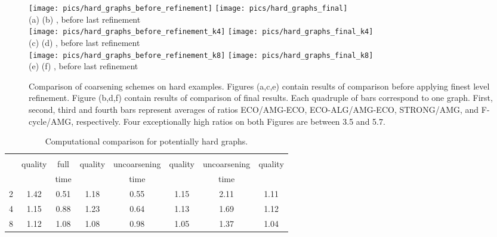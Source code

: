 \documentclass{llncs}
\begin{document}
\begin{figure}
\texttt{[image: pics/hard\_graphs\_before\_refinement]}  \hspace{-1cm}
\texttt{[image: pics/hard\_graphs\_final]}\\
 \hspace{4cm} (a)  \hspace{4cm} (b) , before last refinement \\
\texttt{[image: pics/hard\_graphs\_before\_refinement\_k4]}  \hspace{-1cm}
\texttt{[image: pics/hard\_graphs\_final\_k4]}\\
 \hspace{4cm} (c)  \hspace{4cm} (d) , before last refinement\\
\texttt{[image: pics/hard\_graphs\_before\_refinement\_k8]}  \hspace{-1cm}
\texttt{[image: pics/hard\_graphs\_final\_k8]}\\
 \hspace{4cm} (e)  \hspace{4cm} (f) , before last refinement\\
\caption{Comparison of coarsening schemes on hard examples. Figures (a,c,e) contain results of comparison before applying finest level refinement. Figure (b,d,f) contain results of comparison of final results. Each quadruple of bars correspond to one graph. First, second, third and fourth bars represent averages of ratios ECO/AMG-ECO, ECO-ALG/AMG-ECO, STRONG/AMG, and F-cycle/AMG, respectively. Four exceptionally high ratios on both Figures are between 3.5 and 5.7.}\label{fig:hardgraphs}
\end{figure}
\begin{table}[t]
        
\begin{center}
\vspace*{-.25cm}
\begin{tabular}{|l|c|c||c|c||c|c||c|}
\hline
 &  &  &  &  &  &  &  \\ 
 & quality & full & quality & uncoarsening & quality & uncoarsening  & quality \\ 
 &         &   time   &         & time         &         & time & \\ \hline
2 & 1.42 & 0.51 & 1.18 & 0.55 & 1.15 & 2.11 & 1.11 \\ 
4 & 1.15 & 0.88 & 1.23 & 0.64 & 1.13 & 1.69 & 1.12 \\ 
8 & 1.12 & 1.08 & 1.08 & 0.98 & 1.05 & 1.37 & 1.04 \\ 
\hline
\end{tabular}
\vspace*{.25cm}
\caption{Computational comparison for potentially hard graphs. 
}\label{tab:hard}
\vspace*{-1.25cm}


\end{center}
\end{table}
\end{document}
